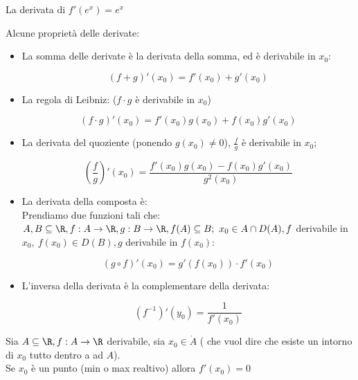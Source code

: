 \documentclass[../analisi.tex]{subfiles}
\begin{document}
\begin{esem}
	La derivata di $ f'(e^x) = e^x$
\end{esem}
Alcune proprietà delle derivate:

\begin{itemize}
	\item La somma delle derivate è la derivata della somma, ed è derivabile
		in $x_0$:
	
		\begin{equation}
			(f+g)'(x_0) = f'(x_0) + g'(x_0)
		\end{equation}
	\item La regola di Leibniz: ($f\cdot g$ è derivabile in $x_0$)

		\begin{equation}
			(f \cdot g)'(x_0)= f'(x_0)g(x_0) +
					   f(x_0)g'(x_0)
		\end{equation}
	\item La derivata del quoziente (ponendo $g(x_0) \neq 0$),
		$\frac{f}{g}$ è derivabile in $x_0$;

		\begin{equation}
			\left( \frac{f}{g} \right)' (x_0) =
			\frac{f' (x_0) g(x_0) - f(x_0) g' (x_0)}{g^2 (x_0)} 
		\end{equation}
	\item La derivata della composta è:\\
		Prendiamo due funzioni tali che:\\
		$A,B \subseteq \R, f: A \to \R, g: B \to \R, f(A) \subseteq B;\
		x_0 \in A \cap D(A), f$ derivabile in $x_0,\ f(x_0) \in D(B), g$
		derivabile in $f(x_0)$:

		\begin{equation}
			(g \circ f)' (x_0) = g' (f(x_0)) \cdot f' (x_0)
		\end{equation}
	\item L'inversa della derivata è la complementare della derivata:

		\begin{equation}
			\left( f^{-1} \right)' (y_0) = \frac{1}{f'(x_0)} 
		\end{equation}
\end{itemize}

\begin{defn}
	Sia $\acr, f: A \to \R$ derivabile, sia $x_0 \in \dot{A}$ ( che vuol dire 
	che esiste un intorno di $x_0$ tutto dentro a ad $A$).\\
	Se $x_0$ è un punto  (min o max realtivo) allora 
	$f'(x_0) = 0$
\end{defn}
\end{document}
